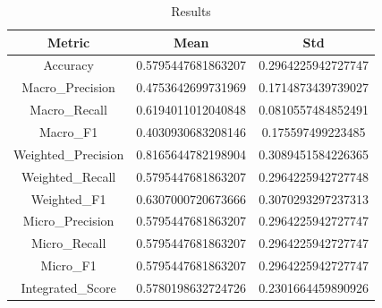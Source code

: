 \begin{table}[htbp]
\centering
\caption{Results}
\label{tab:csv}
\small
\setlength{\tabcolsep}{4pt}
\begin{tabular}{|c|c|c|}
\hline
Metric & Mean & Std \\
\hline
Accuracy & 0.5795447681863207 & 0.2964225942727747 \\
Macro_Precision & 0.4753642699731969 & 0.1714873439739027 \\
Macro_Recall & 0.6194011012040848 & 0.0810557484852491 \\
Macro_F1 & 0.4030930683208146 & 0.175597499223485 \\
Weighted_Precision & 0.8165644782198904 & 0.3089451584226365 \\
Weighted_Recall & 0.5795447681863207 & 0.2964225942727748 \\
Weighted_F1 & 0.6307000720673666 & 0.3070293297237313 \\
Micro_Precision & 0.5795447681863207 & 0.2964225942727747 \\
Micro_Recall & 0.5795447681863207 & 0.2964225942727747 \\
Micro_F1 & 0.5795447681863207 & 0.2964225942727747 \\
Integrated_Score & 0.5780198632724726 & 0.2301664459890926 \\
\hline
\end{tabular}
\end{table}